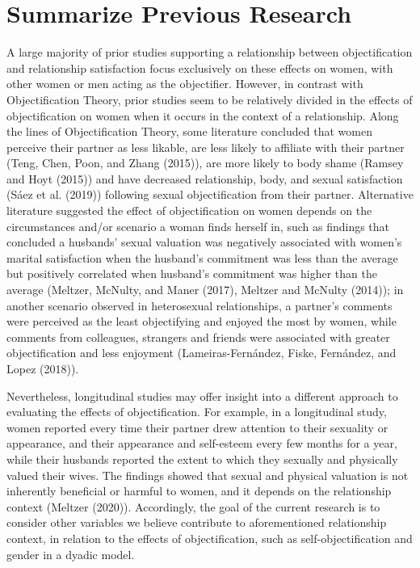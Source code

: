 \documentclass[
  english,
  man]{apa6}
\begin{document}
\hypertarget{summarize-previous-research}{%
\section{Summarize Previous Research}\label{summarize-previous-research}}

A large majority of prior studies supporting a relationship between objectification and relationship satisfaction focus exclusively on these effects on women, with other women or men acting as the objectifier. However, in contrast with Objectification Theory, prior studies seem to be relatively divided in the effects of objectification on women when it occurs in the context of a relationship. Along the lines of Objectification Theory, some literature concluded that women perceive their partner as less likable, are less likely to affiliate with their partner (Teng, Chen, Poon, and Zhang (2015)), are more likely to body shame (Ramsey and Hoyt (2015)) and have decreased relationship, body, and sexual satisfaction (Sáez et al. (2019)) following sexual objectification from their partner. Alternative literature suggested the effect of objectification on women depends on the circumstances and/or scenario a woman finds herself in, such as findings that concluded a husbands' sexual valuation was negatively associated with women's marital satisfaction when the husband's commitment was less than the average but positively correlated when husband's commitment was higher than the average (Meltzer, McNulty, and Maner (2017), Meltzer and McNulty (2014)); in another scenario observed in heterosexual relationships, a partner's comments were perceived as the least objectifying and enjoyed the most by women, while comments from colleagues, strangers and friends were associated with greater objectification and less enjoyment (Lameiras-Fernández, Fiske, Fernández, and Lopez (2018)).

Nevertheless, longitudinal studies may offer insight into a different approach to evaluating the effects of objectification. For example, in a longitudinal study, women reported every time their partner drew attention to their sexuality or appearance, and their appearance and self-esteem every few months for a year, while their husbands reported the extent to which they sexually and physically valued their wives. The findings showed that sexual and physical valuation is not inherently beneficial or harmful to women, and it depends on the relationship context (Meltzer (2020)). Accordingly, the goal of the current research is to consider other variables we believe contribute to aforementioned relationship context, in relation to the effects of objectification, such as self-objectification and gender in a dyadic model.
\end{document}
